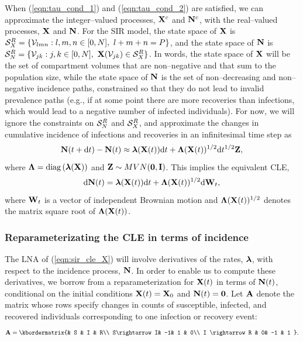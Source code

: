 When (\ref{eqn:tau_cond_1}) and (\ref{eqn:tau_cond_2}) are satisfied, we can approximate the integer--valued processes, $ \mathbf{X}^c $ and $ \mathbf{N}^c $, with the real--valued processes, $ \mathbf{X} $ and $ \mathbf{N} $. For the SIR model, the state space of $ \mathbf{X} $ is $ \mcS_X^R = \lbrace \mcV_{lmn}:l,m,n \in [0,N],\ l+m+n=P\rbrace $, and the state space  of $ \mathbf{N} $ is $ \mathcal{S}_N^R = \lbrace \mathcal{V}_{jk}: j,k \in [0,N],\ \mathbf{X}(\mathcal{V}_{jk})\in\mathcal{S}_X^R \rbrace $. In words, the state space of $ \mathbf{X} $ will be the set of compartment volumes that are non--negative and that sum to the population size, while the state space of $ \mathbf{N} $ is the set of non--decreasing and non--negative incidence paths, constrained so that they do not lead to invalid prevalence paths (e.g., if at some point there are more recoveries than infections, which would lead to a negative number of infected individuals). For now, we will ignore the constraints on $ \mathcal{S}_N^R $ and $ \mathcal{S}_X^R $, and approximate the changes in cumulative incidence of infections and recoveries in an infinitesimal time step as 
\begin{equation}
\mathbf{N}(t+\mathrm{d} t) - \mathbf{N}(t) \approx \boldsymbol{\lambda}(\mathbf{X}(t))\mathrm{d} t + \boldsymbol{\Lambda}(\mathbf{X}(t))^{1/2}\mathrm{d} t^{1/2}\mathbf{Z},
\end{equation}
where $ \boldsymbol{\Lambda} = \mathrm{diag}\left (\boldsymbol{\lambda}(\mathbf{X}) \right )$ and $ \mathbf{Z}\sim MVN(\boldsymbol{0},\mathbf{I}) $. This implies the equivalent CLE,
\begin{equation}
\label{eqn:sir_cle_X}
\mathrm{d} \mathbf{N}(t) = \boldsymbol{\lambda}(\mathbf{X}(t))\mathrm{d} t + \boldsymbol{\Lambda}(\mathbf{X}(t))^{1/2}\mathrm{d}\mathbf{W}_t, 
\end{equation}
where $ \mathbf{W}_t $ is a vector of independent Brownian motion and $ \boldsymbol{\Lambda}(\mathbf{X}(t))^{1/2} $ denotes the matrix square root of $ \boldsymbol{\Lambda}(\mathbf{X}(t)) $. 

\subsubsection{Reparameterizating the CLE in terms of incidence}
\label{subsubsec:cle_repar}
The LNA of (\ref{eqn:sir_cle_X}) will involve derivatives of the rates, $ \boldsymbol{\lambda} $, with respect to the incidence process, $ \mathbf{N} $. In order to enable us to compute these derivatives, we borrow from \cite{breto2011compound,ho2016direct} a reparameterization for $ \mathbf{X} (t)$ in terms of $ \mathbf{N}(t) $, conditional on the initial conditions $ \mathbf{X}(t) = \mathbf{X}_0 $ and $ \mathbf{N}(t) = \boldsymbol{0} $. Let $ \mathbf{A} $ denote the matrix whose rows specify changes in counts of susceptible, infected, and recovered individuals corresponding to one infection or recovery event:
\begin{equation}
\label{eqn:sir_stoich}
\bA = \kbordermatrix{& S & I &  R\\
	S\rightarrow I& -1& 1 & 0\\
	I \rightarrow R & 0& -1 & 1
}.
\end{equation}

